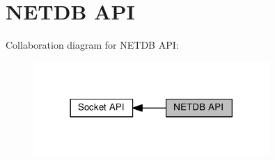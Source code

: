 \hypertarget{group__netdbapi}{}\section{N\+E\+T\+DB A\+PI}
\label{group__netdbapi}
Collaboration diagram for N\+E\+T\+DB A\+PI\+:
\nopagebreak
\begin{figure}[H]
\begin{center}
\leavevmode
\includegraphics[width=254pt]{group__netdbapi}
\end{center}
\end{figure}
